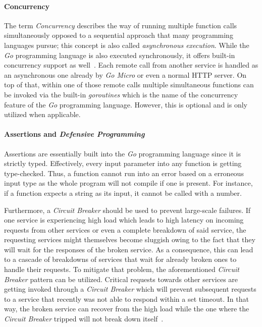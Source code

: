 \documentclass[12pt,a4paper,twoside]{report}
\begin{document}
\paragraph{Concurrency}
The term \textit{Concurrency} describes the way of running multiple function
calls simultaneously opposed to a sequential approach that many programming languages
pursue; this concept is also called \textit{asynchronous execution}.
While the \textit{Go} programming language is also executed synchronously,
it offers built-in concurrency support as well~\cite{golang-concurrency}.
Each remote call from another service is handled as an asynchronous one already
by \textit{Go Micro} or even a normal HTTP server. On top of that, within one
of those remote calls multiple simultaneous functions can be invoked via
the built-in \textit{goroutines} which is the name of the concurrency feature
of the \textit{Go} programming language. However, this is optional and is only
utilized when applicable.

\paragraph{Assertions and \textit{Defensive Programming}}
Assertions are essentially built into the \textit{Go} programming language
since it is strictly typed. Effectively, every input parameter into any
function is getting type-checked. Thus, a function cannot run into an error
based on a erroneous input type as the whole program will not compile
if one is present. For instance, if a function expects a string as its input,
it cannot be called with a number.

Furthermore, a \textit{Circuit Breaker} should be used to prevent large-scale failures.
If one service is experiencing high load which leads to high latency on incoming
requests from other services or even a complete breakdown of said service,
the requesting services might themselves become sluggish owing to the fact
that they will wait for the responses of the broken service.
As a consequence, this can lead to a cascade of breakdowns of services that wait for
already broken ones to handle their requests. To mitigate that problem,
the aforementioned \textit{Circuit Breaker} pattern can be utilized.
Critical requests towards other services are getting invoked through
a \textit{Circuit Breaker} which will prevent subsequent requests to
a service that recently was not able to respond within a set timeout.
In that way, the broken service can recover from the high load
while the one where the \textit{Circuit Breaker} tripped will not
break down itself~\cite{fowler-circuit-breaker}.
\end{document}
